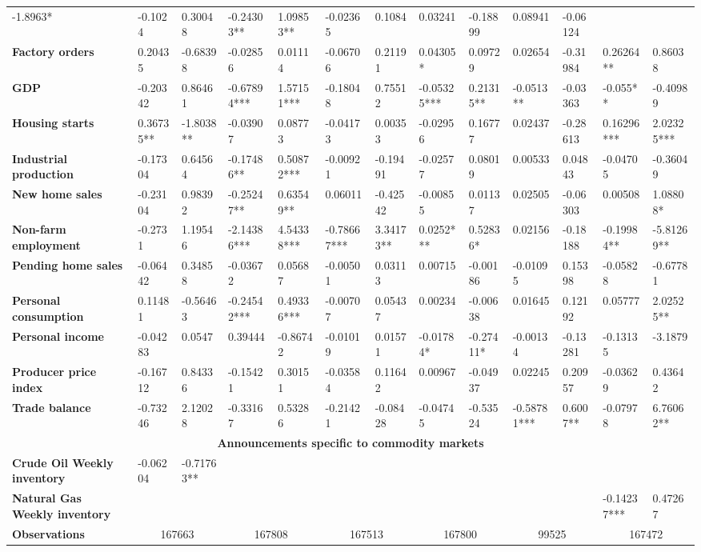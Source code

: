 \begin{sidewaystable}
{\begin{tabular}{@{}lllllllllllll@{}}
-1.8963* & -0.1024 & 0.30048 & -0.24303** & 1.09853** & -0.02365 & 0.1084 & 0.03241 & -0.18899 & 0.08941 & -0.06124 \\ \textbf{Factory orders}& 0.20435 & -0.68398 & -0.02856 & 0.01114 & -0.06706 & 0.21191 & 0.04305* & 0.09729 & 0.02654 & -0.31984 & 0.26264** & 0.86038 \\ \textbf{GDP}& -0.20342 & 0.86461 & -0.67894*** & 1.57151*** & -0.18048 & 0.75512 & -0.05325*** & 0.21315** & -0.0513** & -0.03363 & -0.055** & -0.40989 \\ \textbf{Housing starts}& 0.36735**& -1.8038**& -0.03907 & 0.08773 & -0.04173 & 0.00353 & -0.02956 & 0.16777 & 0.02437 & -0.28613 & 0.16296*** & 2.02325*** \\ \textbf{Industrial production}& -0.17304 & 0.64564 & -0.17486**& 0.50872***& -0.00921 & -0.19491 & -0.02577 & 0.08019 & 0.00533 & 0.04843 & -0.04705 & -0.36049 \\ \textbf{New home sales}& -0.23104 & 0.98392 & -0.25247**& 0.63549**& 0.06011 & -0.42542 & -0.00855 & 0.01137 & 0.02505 & -0.06303 & 0.00508 & 1.08808* \\ \textbf{Non-farm employment}& -0.2731 & 1.19546 & -2.14386*** & 4.54338*** & -0.78667*** & 3.34173** & 0.0252*** & 0.52836* & 0.02156 & -0.18188 & -0.19984** & -5.81269** \\ \textbf{Pending home sales}& -0.06442 & 0.34858 & -0.03672 & 0.05687 & -0.00501 & 0.03113 & 0.00715 & -0.00186 & -0.01095 & 0.15398 & -0.05828 & -0.67781 \\ \textbf{Personal consumption}& 0.11481 & -0.56463 & -0.24542*** & 0.49336*** & -0.00707 & 0.05437 & 0.00234 & -0.00638 & 0.01645 & 0.12192 & 0.05777 & 2.02525** \\ \textbf{Personal income}& -0.04283 & 0.0547 & 0.39444 & -0.86742 & -0.01019 & 0.01571 & -0.01784* & -0.27411* & -0.00134 & -0.13281 & -0.13135 & -3.1879 \\ \textbf{Producer price index}& -0.16712 & 0.84336 & -0.15421 & 0.30151 & -0.03584 & 0.11642 & 0.00967 & -0.04937 & 0.02245 & 0.20957 & -0.03629 & 0.43642 \\ \textbf{Trade balance}& -0.73246 & 2.12028 & -0.33167 & 0.53286 & -0.21421 & -0.08428 & -0.04745 & -0.53524 & -0.58781*** & 0.6007** & -0.07978 & 6.76062** \\  \midrule \multicolumn{13}{c}{\textbf{Announcements specific to commodity markets}} \\ \midrule \textbf{Crude Oil Weekly inventory}& -0.06204 & -0.71763** &  &  &  &  &  &  &  &  &  &  \\ \textbf{Natural Gas Weekly inventory}&  &  &  &  &  &  &  &  &  &  & -0.14237*** & 0.47267 \\  \midrule \textbf{Observations}             &\multicolumn{2}{c}{ 167663 }                                                 & \multicolumn{2}{c}{ 167808 }                                                 & \multicolumn{2}{c}{ 167513 }                                                 & \multicolumn{2}{c}{ 167800 }                                                 & \multicolumn{2}{c}{ 99525 }                                                   & \multicolumn{2}{c}{ 167472 }        
\end{tabular}}
\end{sidewaystable}

